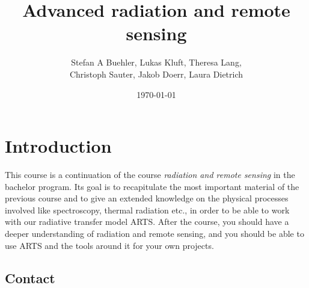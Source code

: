 
\usepackage{mathtools}
\usepackage{amssymb}  %
\renewcommand{\epsilon}{\varepsilon}  %

\usepackage{graphicx}  %
\usepackage{float}  %
\usepackage{floatflt}  %
\usepackage{subcaption}  %

\usepackage{enumerate}
\usepackage{textcomp}  %


\usepackage{chemfig}

\title{Advanced radiation and remote sensing}
\author{Stefan A Buehler, Lukas Kluft, Theresa Lang,\\ Christoph Sauter, Jakob Doerr, Laura Dietrich}
\date{\today}


\maketitle
\thispagestyle{empty}\pagestyle{empty}
\newpage
\tableofcontents
\newpage\pagestyle{fancy}



\section{Introduction}

This course is a continuation of the course \textit{radiation and
  remote sensing} in the bachelor program. Its goal is to
recapitulate the most important material of the previous course and to
give an extended knowledge on the physical processes involved like
spectroscopy, thermal radiation etc., in order to be able to work with
our radiative transfer model ARTS. After the course, you should have a
deeper understanding of radiation and remote sensing, and you should be
able to use ARTS and the tools around it for your own projects.

\subsection*{Contact}

